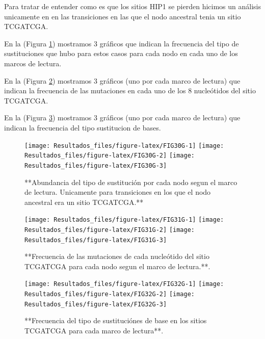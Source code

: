 \documentclass[
]{book}
\begin{document}
Para tratar de entender como es que los sitios HIP1 se pierden hicimos un análisis unicamente en en las transiciones en las que el nodo ancestral tenia un sitio TCGATCGA.

En la (Figura \ref{fig:FIG30G}) mostramos 3 gráficos que indican la frecuencia del tipo de sustituciones que hubo para estos casos para cada nodo en cada uno de los marcos de lectura.

En la (Figura \ref{fig:FIG31G}) mostramos 3 gráficos (uno por cada marco de lectura) que indican la frecuencia de las mutaciones en cada uno de los 8 nucleótidos del sitio TCGATCGA.

En la (Figura \ref{fig:FIG32G}) mostramos 3 gráficos (uno por cada marco de lectura) que indican la frecuencia del tipo sustitucion de bases.

\begin{figure}

{\centering \texttt{[image: Resultados\_files/figure-latex/FIG30G-1]} \texttt{[image: Resultados\_files/figure-latex/FIG30G-2]} \texttt{[image: Resultados\_files/figure-latex/FIG30G-3]} 

}

\caption{**Abundancia del tipo de sustitución por cada nodo segun el marco de lectura. Unicamente para transiciones en los que el nodo ancestral era un sitio TCGATCGA.**}\label{fig:FIG30G}
\end{figure}

\begin{figure}

{\centering \texttt{[image: Resultados\_files/figure-latex/FIG31G-1]} \texttt{[image: Resultados\_files/figure-latex/FIG31G-2]} \texttt{[image: Resultados\_files/figure-latex/FIG31G-3]} 

}

\caption{**Frecuencia de las mutaciones de cada nucleótido del sitio TCGATCGA para cada nodo segun el marco de lectura.**.}\label{fig:FIG31G}
\end{figure}

\begin{figure}

{\centering \texttt{[image: Resultados\_files/figure-latex/FIG32G-1]} \texttt{[image: Resultados\_files/figure-latex/FIG32G-2]} \texttt{[image: Resultados\_files/figure-latex/FIG32G-3]} 

}

\caption{**Frecuencia del tipo de sustituciónes de base en los sitios TCGATCGA para cada marco de lectura**.}\label{fig:FIG32G}
\end{figure}
\end{document}
